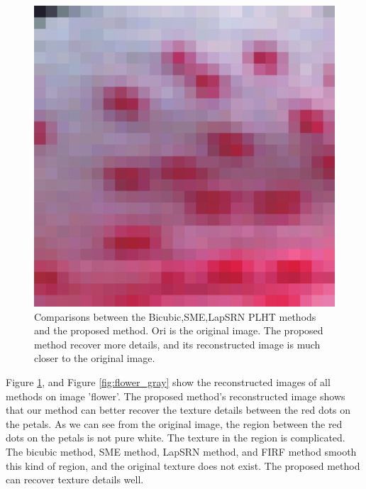 \documentclass[review,numbers,sort&compress]{elsarticle}  %
\begin{document}
\begin{figure}[htbp]
{\begin{minipage}[b]{0.12\textwidth}
                \includegraphics[width=1\textwidth]{compareImage/ORI_flowers_mag_2.png}
            \end{minipage}
        }
    \caption{ Comparisons between the Bicubic,SME,LapSRN PLHT methods and the proposed method. Ori is the original image. The proposed method recover more details, and its reconstructed image is much closer to the original image.}
    \label{fig:flower_color}
\end{figure}

Figure \ref{fig:flower_color}, and Figure \ref{fig:flower_gray} show the reconstructed images of all methods on image 'flower'. The proposed method’s reconstructed image shows that our method can better recover the texture details between the red dots on the petals. As we can see from the original image, the region between the red dots on the petals is not pure white. The texture in the region is complicated. The bicubic method, SME method, LapSRN method, and FIRF method smooth this kind of region, and the original texture does not exist. The proposed method can recover texture details well.
\end{document}
